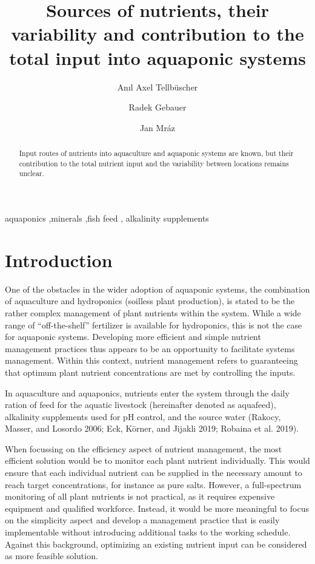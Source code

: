 \documentclass[preprint, 3p,
authoryear]{elsarticle} %
\begin{document}
\begin{frontmatter}

  \title{Sources of nutrients, their variability and contribution to the
total input into aquaponic systems}
    \author[USB]{Anıl Axel Tellbüscher%
  }
    \author[USB]{Radek Gebauer%
  }
    \author[USB]{Jan Mráz%
  }
      \affiliation[USB]{}
  
  \begin{abstract}
  Input routes of nutrients into aquaculture and aquaponic systems are
  known, but their contribution to the total nutrient input and the
  variability between locations remains unclear.
  \end{abstract}
    \begin{keyword}
    aquaponics \sep minerals \sep fish feed \sep 
    alkalinity supplements
  \end{keyword}
  
 \end{frontmatter}

\hypertarget{introduction}{%
\section{Introduction}\label{introduction}}

One of the obstacles in the wider adoption of aquaponic systems, the
combination of aquaculture and hydroponics (soilless plant production),
is stated to be the rather complex management of plant nutrients within
the system. While a wide range of ``off-the-shelf'' fertilizer is
available for hydroponics, this is not the case for aquaponic systems.
Developing more efficient and simple nutrient management practices thus
appears to be an opportunity to facilitate systems management. Within
this context, nutrient management refers to guaranteeing that optimum
plant nutrient concentrations are met by controlling the inputs.

In aquaculture and aquaponics, nutrients enter the system through the
daily ration of feed for the aquatic livestock (hereinafter denoted as
aquafeed), alkalinity supplements used for pH control, and the source
water (Rakocy, Masser, and Losordo 2006; Eck, Körner, and Jijakli 2019;
Robaina et al. 2019).

When focussing on the efficiency aspect of nutrient management, the most
efficient solution would be to monitor each plant nutrient individually.
This would ensure that each individual nutrient can be supplied in the
necessary amount to reach target concentrations, for instance as pure
salts. However, a full-spectrum monitoring of all plant nutrients is not
practical, as it requires expensive equipment and qualified workforce.
Instead, it would be more meaningful to focus on the simplicity aspect
and develop a management practice that is easily implementable without
introducing additional tasks to the working schedule. Against this
background, optimizing an existing nutrient input can be considered as
more feasible solution.
\end{document}
